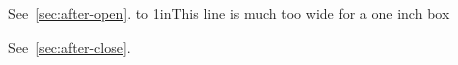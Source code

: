 \documentclass{article}
\begin{document}

See~\ref{sec:after-open}.
\hbox to 1in{This line is much too wide for a one inch box}

See~\ref{sec:after-close}.
\end{document}
